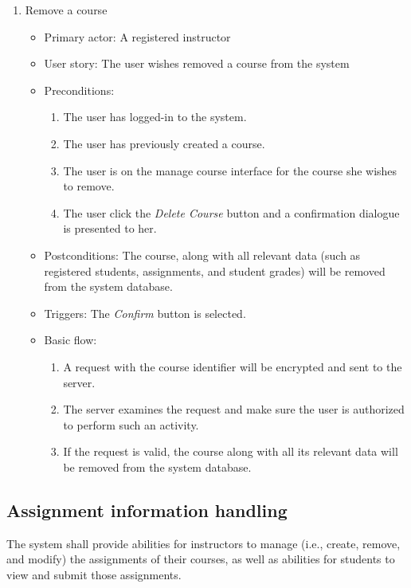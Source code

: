 \begin{enumerate}
\item Remove a course
\begin{itemize}
    \item Primary actor: A registered instructor
    \item User story: The user wishes removed a course from the system
    \item Preconditions:
        \begin{enumerate}
            \item The user has logged-in to the system.
            \item The user has previously created a course.
            \item The user is on the manage course interface for the course
                she wishes to remove.
            \item The user click the \emph{Delete Course} button and a
                confirmation dialogue is presented to her.
        \end{enumerate}
    \item Postconditions:
        The course, along with all relevant data (such as registered students,
        assignments, and student grades) will be removed from the system
        database.
    \item Triggers: The \emph{Confirm} button is selected.
    \item Basic flow:
        \begin{enumerate}
            \item A request with the course identifier will be encrypted and
                sent to the server.
            \item The server examines the request and make sure the user is
                authorized to perform such an activity.
            \item If the request is valid, the course along with all its
                relevant data will be removed from the system database.
        \end{enumerate}
\end{itemize}

\end{enumerate}

\subsection{Assignment information handling}
The system shall provide abilities for instructors to manage (i.e., create,
remove, and modify) the assignments of their courses, as well as abilities for
students to view and submit those assignments.

